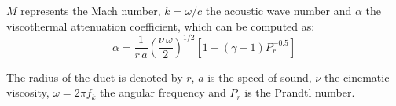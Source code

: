 $M$ represents the Mach number, $k=\omega/c$ the acoustic wave number and $\alpha$ the viscothermal attenuation coefficient, which can be computed as:
\begin{equation}
  \alpha=\frac{1}{r\,a}\left(\frac{\nu\,\omega}{2}\right)^{1/2}\left[1-(\gamma-1)P_r^{-0.5}\right]
\end{equation}

The radius of the duct is denoted by $r$, $a$ is the speed of sound, $\nu$ the cinematic viscosity, $\omega=2\pi f_k$ the angular frequency and $P_r$ is the Prandtl number.